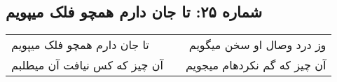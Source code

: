 \begin{center}
\section*{شماره ۲۵: تا جان دارم همچو فلک میپویم}
\label{sec:025}
\begin{longtable}{l p{0.5cm} r}
تا جان دارم همچو فلک میپویم
&&
وز درد وصال او سخن میگویم
\\
آن چیز که کس نیافت آن میطلبم
&&
آن چیز که گم نکردهام میجویم
\\
\end{longtable}
\end{center}
